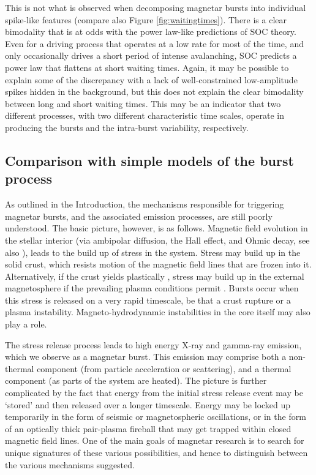 \documentclass[12pt]{emulateapj}
\begin{document}
This is not what is observed when decomposing magnetar bursts into individual spike-like features (compare also Figure \ref{fig:waitingtimes}). There is a
clear bimodality that is at odds with the power law-like predictions of SOC theory. Even for a driving process that operates at a low
rate for most of the time, and only occasionally drives a short period of intense avalanching, SOC predicts a power law that flattens at short
waiting times. Again, it may be possible to explain some of the discrepancy with a lack of well-constrained low-amplitude spikes hidden in 
the background, but this does not explain the clear bimodality between long and short waiting times. This may be an indicator that two different
processes, with two different characteristic time scales, operate in producing the bursts and the intra-burst variability, respectively. 


\subsection{Comparison with simple models of the burst process}
As outlined in the Introduction, the mechanisms responsible for triggering magnetar bursts, and the associated emission processes,
 are still poorly understood. The basic picture, however, is as follows. Magnetic field evolution in the stellar interior (via ambipolar diffusion,  the Hall effect, and Ohmic decay, see also \citealt{goldreich1992}), leads to the build up of stress in the system. Stress may build up in the solid crust, which resists motion of the 
 magnetic field lines that are frozen into it. Alternatively, if the crust yields plastically \citep{jones2003,levin2012}, stress may build up in the external magnetosphere if the 
 prevailing plasma conditions permit \citep{beloborodov2014}. Bursts occur when this stress is released on a very rapid timescale, be that a crust rupture or a plasma instability. 
 Magneto-hydrodynamic instabilities in the core itself may also play a role.

The stress release process leads to high energy X-ray and gamma-ray emission, which we observe as a magnetar burst. This emission may comprise 
both a non-thermal component (from particle acceleration or scattering), and a thermal component (as parts of the system are heated). The picture is 
further complicated by the fact that energy from the initial stress release event may be `stored' and then released over a longer timescale. Energy may 
be locked up temporarily in the form of seismic or magnetospheric oscillations, or in the form of an optically thick pair-plasma fireball that may get trapped
 within closed magnetic field lines. One of the main goals of magnetar research is to search for unique signatures of these various possibilities, and hence 
 to distinguish between the various mechanisms suggested.
\end{document}
